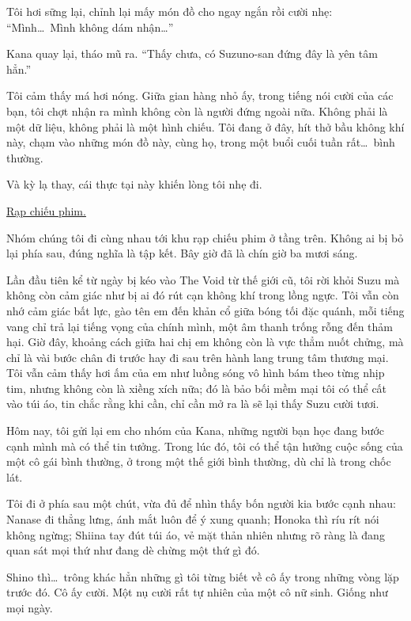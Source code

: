 \documentclass[../main.tex]{subfiles}
\begin{document}
Tôi hơi sững lại, chỉnh lại mấy món đồ cho ngay ngắn rồi cười nhẹ: ``Mình\dots\ Mình không dám nhận\dots''

Kana quay lại, tháo mũ ra. ``Thấy chưa, có Suzuno-san đứng đây là yên tâm hẳn.''

Tôi cảm thấy má hơi nóng. Giữa gian hàng nhỏ ấy, trong tiếng nói cười của các bạn, tôi chợt nhận ra mình không còn là người đứng ngoài nữa. Không phải là một dữ liệu, không phải là một hình chiếu. Tôi đang ở đây, hít thở bầu không khí này, chạm vào những món đồ này, cùng họ, trong một buổi cuối tuần rất\dots\ bình thường.

Và kỳ lạ thay, cái thực tại này khiến lòng tôi nhẹ đi.

\begin{center}
  \uline{Rạp chiếu phim.}
\end{center}

Nhóm chúng tôi đi cùng nhau tới khu rạp chiếu phim ở tầng trên. Không ai bị bỏ lại phía sau, đúng nghĩa là tập kết. Bây giờ đã là chín giờ ba mươi sáng.

Lần đầu tiên kể từ ngày bị kéo vào The Void từ thế giới cũ, tôi rời khỏi Suzu mà không còn cảm giác như bị ai đó rút cạn không khí trong lồng ngực. Tôi vẫn còn nhớ cảm giác bất lực, gào tên em đến khản cổ giữa bóng tối đặc quánh, mỗi tiếng vang chỉ trả lại tiếng vọng của chính mình, một âm thanh trống rỗng đến thảm hại. Giờ đây, khoảng cách giữa hai chị em không còn là vực thẳm nuốt chửng, mà chỉ là vài bước chân đi trước hay đi sau trên hành lang trung tâm thương mại. Tôi vẫn cảm thấy hơi ấm của em như luồng sóng vô hình bám theo từng nhịp tim, nhưng không còn là xiềng xích nữa; đó là bảo bối mềm mại tôi có thể cất vào túi áo, tin chắc rằng khi cần, chỉ cần mở ra là sẽ lại thấy Suzu cười tươi.

Hôm nay, tôi gửi lại em cho nhóm của Kana, những người bạn học đang bước cạnh mình mà có thể tin tưởng. Trong lúc đó, tôi có thể tận hưởng cuộc sống của một cô gái bình thường, ở trong một thế giới bình thường, dù chỉ là trong chốc lát.

Tôi đi ở phía sau một chút, vừa đủ để nhìn thấy bốn người kia bước cạnh nhau: Nanase đi thẳng lưng, ánh mắt luôn để ý xung quanh; Honoka thì ríu rít nói không ngừng; Shiina tay đút túi áo, vẻ mặt thản nhiên nhưng rõ ràng là đang quan sát mọi thứ như đang dè chừng một thứ gì đó.

Shino thì\dots\ trông khác hẳn những gì tôi từng biết về cô ấy trong những vòng lặp trước đó. Cô ấy cười. Một nụ cười rất tự nhiên của một cô nữ sinh. Giống như mọi ngày.
\end{document}
